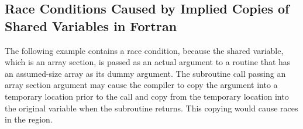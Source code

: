 \pagebreak
\begin{fortranspecific}[4ex]
\section{Race Conditions Caused by Implied Copies of Shared Variables in Fortran}
\label{sec:fort_race}

The following example contains a race condition, because the shared variable, which 
is an array section, is passed as an actual argument to a routine that has an assumed-size 
array as its dummy argument. The subroutine call passing an array section argument 
may cause the compiler to copy the argument into a temporary location prior to 
the call and copy from the temporary location into the original variable when the 
subroutine returns. This copying would cause races in the  region.

\end{fortranspecific}


